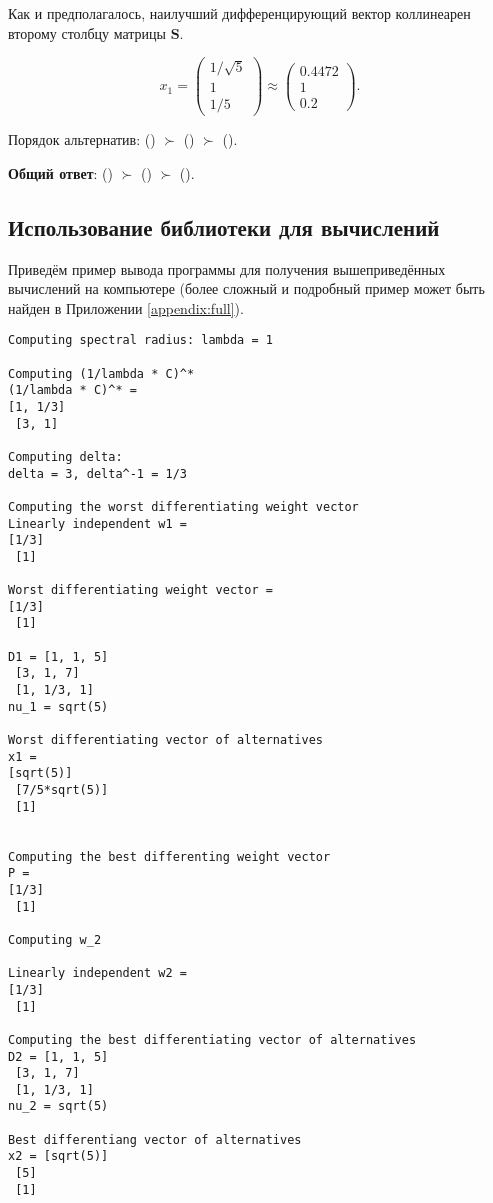 \documentclass[specialist,
	substylefile = spbu.rtx,
	subf,href,colorlinks=true, 12pt]{disser}
\begin{document}
Как и предполагалось, наилучший дифференцирующий вектор коллинеарен второму столбцу матрицы \(\mathbf{S}\).

\[
	x_1 = \begin{pmatrix}
		1/\sqrt{5} \\1\\1/5
	\end{pmatrix} \approx \begin{pmatrix}
		0.4472 \\ 1 \\ 0.2
	\end{pmatrix}.
\]

Порядок альтернатив: () \(\succ\) () \(\succ\) ().

\textbf{Общий ответ}: () \(\succ\) () \(\succ\) ().

\subsection{Использование библиотеки для вычислений}
Приведём пример вывода программы для получения вышеприведённых вычислений на компьютере (более сложный и подробный пример может быть найден в Приложении \ref{appendix:full}).

\begin{verbatim}
Computing spectral radius: lambda = 1

Computing (1/lambda * C)^*
(1/lambda * C)^* =
[1, 1/3]
 [3, 1]

Computing delta:
delta = 3, delta^-1 = 1/3

Computing the worst differentiating weight vector
Linearly independent w1 =
[1/3]
 [1]

Worst differentiating weight vector =
[1/3]
 [1]

D1 = [1, 1, 5]
 [3, 1, 7]
 [1, 1/3, 1]
nu_1 = sqrt(5)

Worst differentiating vector of alternatives
x1 =
[sqrt(5)]
 [7/5*sqrt(5)]
 [1]


Computing the best differenting weight vector
P =
[1/3]
 [1]

Computing w_2

Linearly independent w2 =
[1/3]
 [1]

Computing the best differentiating vector of alternatives
D2 = [1, 1, 5]
 [3, 1, 7]
 [1, 1/3, 1]
nu_2 = sqrt(5)

Best differentiang vector of alternatives
x2 = [sqrt(5)]
 [5]
 [1]
\end{verbatim}
\end{document}
